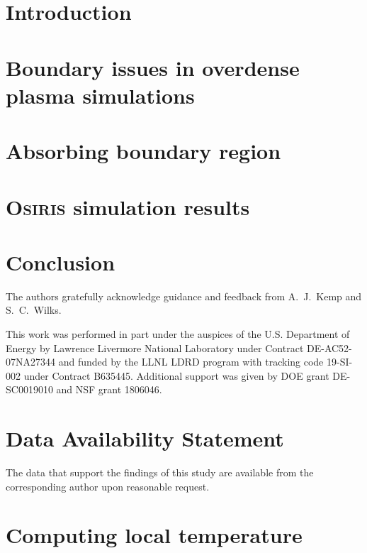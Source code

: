 \documentclass[%
 aip,
 amsmath,amssymb,
 reprint,%
]{revtex4-2}
\begin{document}
\section{Introduction} \label{sec:intro}



\section{Boundary issues in overdense plasma simulations} \label{sec:overdense}



\section{Absorbing boundary region} \label{sec:absorber}



\section{\textsc{Osiris} simulation results} \label{sec:results}



\section{Conclusion}
 \label{sec:conclusion}

\begin{acknowledgments}
The authors gratefully acknowledge guidance and feedback from A.~J.~Kemp and S.~C.~Wilks.

This work was performed in part under the auspices of the U.S. Department of Energy by Lawrence Livermore National Laboratory under Contract DE-AC52-07NA27344 and funded by the LLNL LDRD program with tracking code 19-SI-002 under Contract B635445. Additional support was given by DOE grant DE-SC0019010 and NSF grant 1806046.
\end{acknowledgments}

\section*{Data Availability Statement}

The data that support the findings of this study are available from the corresponding author upon reasonable request.

\appendix

\section{Computing local temperature} \label{app:temp}


\nocite{*}
\end{document}
